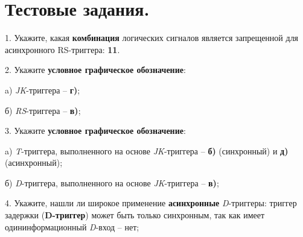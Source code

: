 \documentclass[bachelor, och, otchet, hidelinks]{SCWorks}
\begin{document}
\newpage

\section*{Тестовые задания.}

\par 1. Укажите, какая \textbf{комбинация} логических сигналов является запрещенной для асинхронного RS-триггера: 
\textbf{11}.

\par 2. Укажите \textbf{условное графическое обозначение}:
\par a) \textit{JK}-триггера -- \textbf{г)};
\par б) \textit{RS}-триггера -- \textbf{в)};

\begin{figure}[h]
\end{figure}

\par 3. Укажите \textbf{условное графическое обозначение}:

\par a) \textit{T}-триггера, выполненного на основе \textit{JK}-триггера -- \textbf{б)} (синхронный) и 
\textbf{д)} (асинхронный);
\par б) \textit{D}-триггера, выполненного на основе \textit{JK}-триггера -- \textbf{в)};

\begin{figure}[h]
\end{figure}

\par 4. Укажите, нашли ли широкое применение \textbf{асинхронные} \textit{D}-триггеры: триггер задержки 
(\textbf{D-триггер}) может быть только синхронным, так как имеет одининформационный \textit{D}-вход -- нет;
\end{document}
